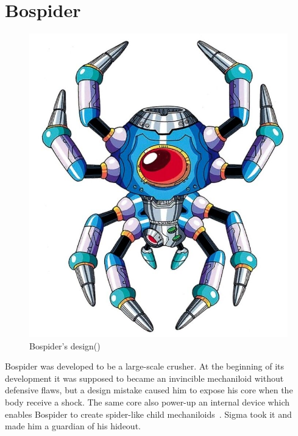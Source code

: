 \section{Bospider}\label{boss:bospider}
\begin{figure}[htp]
	\centering
	\includegraphics[width=0.35\linewidth]{figures/X1/Sigma_stages/Bospider.jpg}
	\caption{Bospider's design(\cite{book:MMX_Complete_art})}
\end{figure}
Bospider was developed to be a large-scale crusher. At the beginning of its development it was supposed to became an invincible mechaniloid without defensive flaws, but a design mistake caused him to expose his core when the body receive a shock. The same core also power-up an internal device which enables Bospider to create spider-like child mechaniloids~\cite{wayback:X_resources}. Sigma took it and made him a guardian of his hideout.

